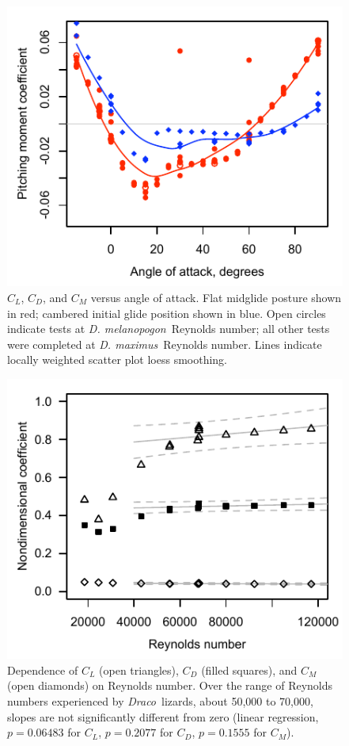 \documentclass[10pt]{article}
\newcommand{\Draco}{\emph{Draco}}
\newcommand{\Dmelanopogon}{\emph{D. melanopogon}}
\newcommand{\Dmaximus}{\emph{D. maximus}}
\begin{document}
\begin{figure}
\includegraphics{figures/pitch_v_aoa.pdf} 
\caption{$C_L$, $C_D$, and $C_M$ versus angle of attack.  Flat midglide posture shown in red; cambered initial glide position shown in blue.  Open circles indicate tests at \Dmelanopogon\ Reynolds number; all other tests were completed at \Dmaximus\ Reynolds number.  Lines indicate locally weighted scatter plot loess smoothing.}
\label{fig:lift_aoa}
\end{figure}

\begin{figure}
\includegraphics{figures/coeffs_v_Re.pdf}
\caption{Dependence of $C_L$ (open triangles), $C_D$ (filled squares), and $C_M$ (open diamonds) on Reynolds number.  Over the range of Reynolds numbers experienced by \Draco\ lizards, about 50,000 to 70,000, slopes are not significantly different from zero (linear regression, $p=0.06483$ for $C_L$, $p=0.2077$ for $C_D$, $p=0.1555$ for $C_M$).}
\label{fig:coeffs_Re}
\end{figure}
\end{document}
